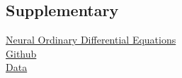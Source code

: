\documentclass{article}
\begin{document}
\newpage
\subsection*{Supplementary}
\href{https://arxiv.org/abs/1806.07366}{Neural Ordinary Differential Equations
} \\
\href{https://github.com/roberts2510/MMoF}{Github}\\
\href{https://en.wikipedia.org/wiki/Pendulum_(mechanics)#Coupled_pendula}{Data}
\end{document}
